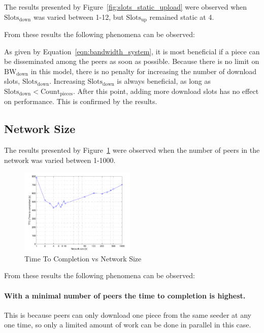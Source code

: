 \documentclass[a4paper,12pt,twocolumn]{article}
\newcommand{\fref}[1]{Figure~\ref{#1}}
\newcommand{\eref}[1]{Equation~\ref{#1}}
\begin{document}
The results presented by \fref{fig:slots_static_upload} were observed when $\text{Slots}_{\text{down}}$ was varied between 1-12, but $\text{Slots}_{\text{up}}$ remained static at 4.

From these results the following phenomena can be observed:

As given by \eref{eqn:bandwidth_system}, it is most beneficial if a piece can be disseminated among the peers as soon as possible.
Because there is no limit on $\text{BW}_{\text{down}}$ in this model, there is no penalty for increasing the number of download slots, $\text{Slots}_{\text{down}}$. Increasing $\text{Slots}_{\text{down}}$ is always beneficial, as long as $\text{Slots}_{\text{down}} < \text{Count}_{\text{pieces}}$. After this point, adding more download slots has no effect on performance.
This is confirmed by the results.

\subsection{Network Size}
\label{subsec:network_size_results}

The results presented by \fref{fig:network_size} were observed when the number of peers in the network was varied between 1-1000.

\begin{figure}[!htbp]
  \centering
  \includegraphics[width=0.49\textwidth]{figs/Experiment2_TTC}
  \caption{Time To Completion vs Network Size}
  \label{fig:network_size}
\end{figure}

From these results the following phenomena can be observed:

\paragraph{With a minimal number of peers the time to completion is highest.} This is because peers can only download one piece from the same seeder at any one time, so only a limited amount of work can be done in parallel in this case.
\end{document}
